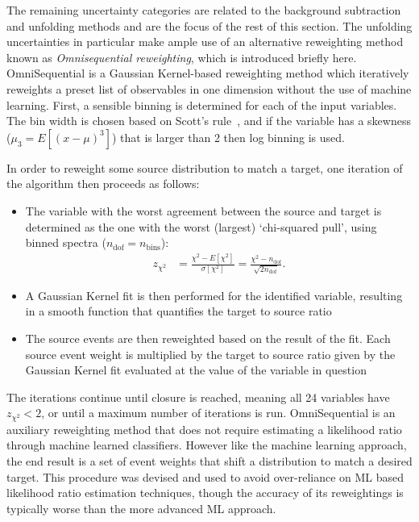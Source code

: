 The remaining uncertainty categories are related to the background subtraction and unfolding methods and are the focus of the rest of this section.
The unfolding uncertainties in particular make ample use of an alternative reweighting method known as \textit{Omnisequential reweighting}, which is introduced briefly here.
OmniSequential is a Gaussian Kernel-based reweighting method which iteratively reweights a preset list of observables in one dimension without the use of machine learning.
First, a sensible binning is determined for each of the input variables. 
The bin width is chosen based on Scott's rule~\cite{scott1979optimal}, and if the variable has a skewness ($\mu_3=E[(x-\mu)^3]$) that is larger than 2 then log binning is used.

In order to reweight some source distribution to match a target, one iteration of the algorithm then proceeds as follows: 
\begin{itemize}
  \item The variable with the worst agreement between the source and target is determined as the one with the worst (largest) `chi-squared pull', using binned spectra ($n_\text{dof}=n_\text{bins}$):
  \begin{align}
  z_{\chi^2} &= \frac{\chi^2-E[\chi^2]}{\sigma[\chi^2]} = \frac{\chi^2-n_\text{dof}}{\sqrt{2n_\text{dof}}}.
  \end{align}
  \item A Gaussian Kernel fit is then performed for the identified variable, resulting in a smooth function that quantifies the target to source ratio
  \item The source events are then reweighted based on the result of the fit. Each source event weight is multiplied by the target to source ratio given by the Gaussian Kernel fit evaluated at the value of the variable in question
\end{itemize}
The iterations continue until closure is reached, meaning all 24 variables have $z_{\chi^2}<2$, or until a maximum number of iterations is run.
OmniSequential is an auxiliary reweighting method that does not require estimating a likelihood ratio through machine learned classifiers.
However like the machine learning approach, the end result is a set of event weights that shift a distribution to match a desired target.
This procedure was devised and used to avoid over-reliance on ML based likelihood ratio estimation techniques, though the accuracy of its reweightings is typically worse than the more advanced ML approach.

